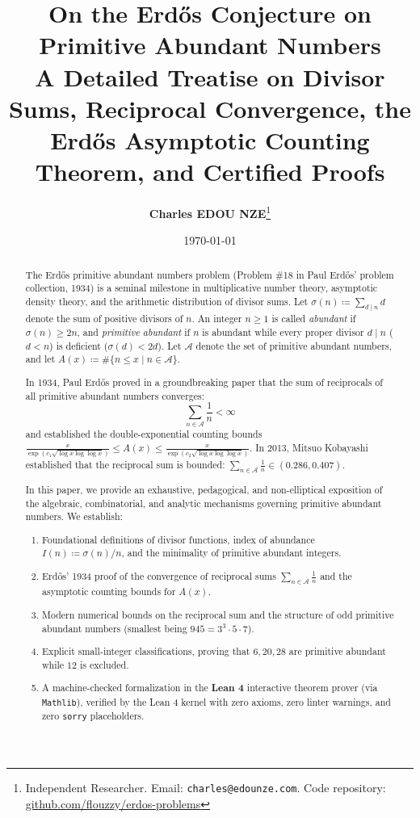 \documentclass[11pt,a4paper]{article}
\title{\textbf{\Large On the Erd\H{o}s Conjecture on Primitive Abundant Numbers}\\[0.5em]
\large A Detailed Treatise on Divisor Sums, Reciprocal Convergence, the Erd\H{o}s Asymptotic Counting Theorem, and Certified Proofs}
\author{\textbf{Charles EDOU NZE}\thanks{Independent Researcher. Email: \texttt{charles@edounze.com}. Code repository: \href{https://github.com/flouzzy/erdos-problems}{github.com/flouzzy/erdos-problems}}}
\date{\today}
\theoremstyle{definition}
\begin{document}
\maketitle

\begin{abstract}
The Erd\H{o}s primitive abundant numbers problem (Problem \#18 in Paul Erd\H{o}s' problem collection, 1934) is a seminal milestone in multiplicative number theory, asymptotic density theory, and the arithmetic distribution of divisor sums. Let $\sigma(n) \coloneqq \sum_{d \mid n} d$ denote the sum of positive divisors of $n$. An integer $n \ge 1$ is called \emph{abundant} if $\sigma(n) \ge 2n$, and \emph{primitive abundant} if $n$ is abundant while every proper divisor $d \mid n$ ($d < n$) is deficient ($\sigma(d) < 2d$). Let $\mathcal{A}$ denote the set of primitive abundant numbers, and let $A(x) \coloneqq \# \{ n \le x \mid n \in \mathcal{A} \}$.

In 1934, Paul Erd\H{o}s proved in a groundbreaking paper that the sum of reciprocals of all primitive abundant numbers converges:
\[ \sum_{n \in \mathcal{A}} \frac{1}{n} < \infty \]
and established the double-exponential counting bounds $\frac{x}{\exp(c_1 \sqrt{\log x \log \log x})} \le A(x) \le \frac{x}{\exp(c_2 \sqrt{\log x \log \log x})}$. In 2013, Mitsuo Kobayashi established that the reciprocal sum is bounded: $\sum_{n \in \mathcal{A}} \frac{1}{n} \in (0.286, 0.407)$.

In this paper, we provide an exhaustive, pedagogical, and non-elliptical exposition of the algebraic, combinatorial, and analytic mechanisms governing primitive abundant numbers. We establish:
\begin{enumerate}
    \item Foundational definitions of divisor functions, index of abundance $I(n) \coloneqq \sigma(n)/n$, and the minimality of primitive abundant integers.
    \item Erd\H{o}s' 1934 proof of the convergence of reciprocal sums $\sum_{n \in \mathcal{A}} \frac{1}{n}$ and the asymptotic counting bounds for $A(x)$.
    \item Modern numerical bounds on the reciprocal sum and the structure of odd primitive abundant numbers (smallest being $945 = 3^3 \cdot 5 \cdot 7$).
    \item Explicit small-integer classifications, proving that $6, 20, 28$ are primitive abundant while $12$ is excluded.
    \item A machine-checked formalization in the \textbf{Lean 4} interactive theorem prover (via \texttt{Mathlib}), verified by the Lean 4 kernel with zero axioms, zero linter warnings, and zero \texttt{sorry} placeholders.
\end{enumerate}
\end{abstract}
\end{document}
